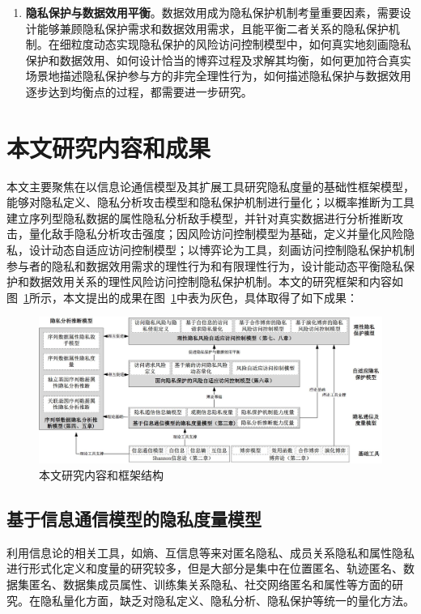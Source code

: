 \begin{enumerate}
	\item \textbf{隐私保护与数据效用平衡}。数据效用成为隐私保护机制考量重要因素，需要设计能够兼顾隐私保护需求和数据效用需求，且能平衡二者关系的隐私保护机制。在细粒度动态实现隐私保护的风险访问控制模型中，如何真实地刻画隐私保护和数据效用、如何设计恰当的博弈过程及求解其均衡，如何更加符合真实场景地描述隐私保护参与方的非完全理性行为，如何描述隐私保护与数据效用逐步达到均衡点的过程，都需要进一步研究。
\end{enumerate}

\section{本文研究内容和成果}

本文主要聚焦在以信息论通信模型及其扩展工具研究隐私度量的基础性框架模型，能够对隐私定义、隐私分析攻击模型和隐私保护机制进行量化；以概率推断为工具建立序列型隐私数据的属性隐私分析敌手模型，并针对真实数据进行分析推断攻击，量化敌手隐私分析攻击强度；因风险访问控制模型为基础，定义并量化风险隐私，设计动态自适应访问控制模型；以博弈论为工具，刻画访问控制隐私保护机制参与者的隐私和数据效用需求的理性行为和有限理性行为，设计能动态平衡隐私保护和数据效用关系的理性风险访问控制隐私保护机制。本文的研究框架和内容如图~\ref{fig:chapter1-research-framework}所示，本文提出的成果在图~\ref{fig:chapter1-research-framework}中表为灰色，具体取得了如下成果：

\begin{figure}[htbp]
	\centering
	\includegraphics[width = 0.99\linewidth]{./figures/chapter1-research-framework.jpg}
	\caption{本文研究内容和框架结构}
	\label{fig:chapter1-research-framework}
\end{figure}

\subsection{基于信息通信模型的隐私度量模型}
利用信息论的相关工具，如熵、互信息等来对匿名隐私、成员关系隐私和属性隐私进行形式化定义和度量的研究较多，但是大部分是集中在位置匿名、轨迹匿名、数据集匿名、数据集成员属性、训练集关系隐私、社交网络匿名和属性等方面的研究。在隐私量化方面，缺乏对隐私定义、隐私分析、隐私保护等统一的量化方法。


